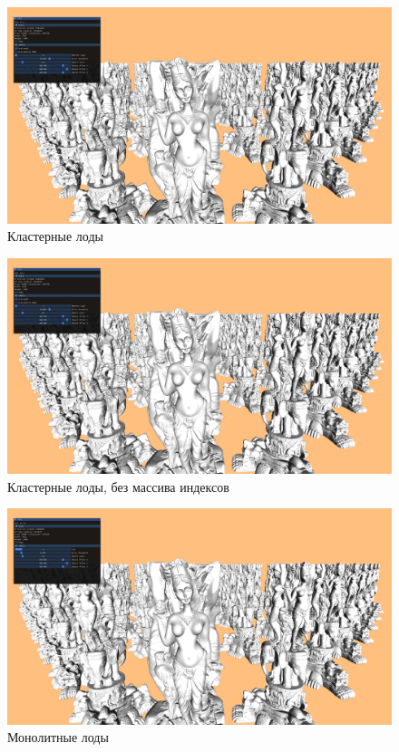 \begin{figure}[H]
    \centering
    \includegraphics[width=\textwidth]{pics/comparison-1.png}
    \caption{Кластерные лоды}
    \label{fig:impl-cluster-1}
\end{figure}

\begin{figure}[H]
    \centering
    \includegraphics[width=\textwidth]{pics/comparison-2.png}
    \caption{Кластерные лоды, без массива индексов}
    \label{fig:impl-cluster-2}
\end{figure}

\begin{figure}[H]
    \centering
    \includegraphics[width=\textwidth]{pics/comparison-3.png}
    \caption{Монолитные лоды}
    \label{fig:impl-mono}
\end{figure}

